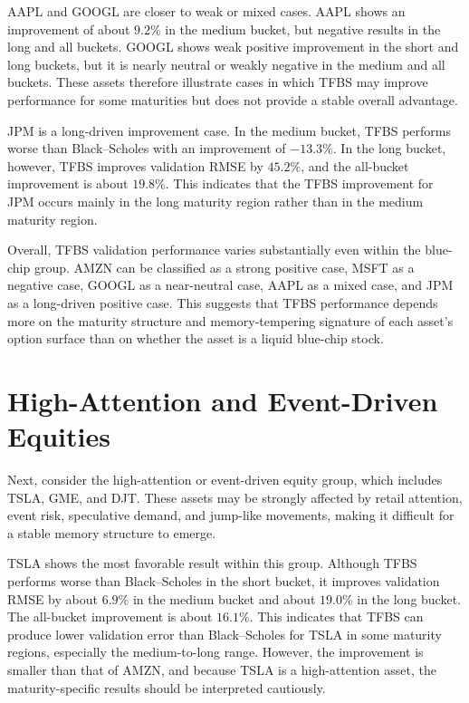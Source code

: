 \documentclass[11pt,a4paper]{report}
\begin{document}
AAPL and GOOGL are closer to weak or mixed cases. AAPL shows an improvement of about $9.2\%$ in the medium bucket, but negative results in the long and all buckets. GOOGL shows weak positive improvement in the short and long buckets, but it is nearly neutral or weakly negative in the medium and all buckets. These assets therefore illustrate cases in which TFBS may improve performance for some maturities but does not provide a stable overall advantage.

JPM is a long-driven improvement case. In the medium bucket, TFBS performs worse than Black--Scholes with an improvement of $-13.3\%$. In the long bucket, however, TFBS improves validation RMSE by $45.2\%$, and the all-bucket improvement is about $19.8\%$. This indicates that the TFBS improvement for JPM occurs mainly in the long maturity region rather than in the medium maturity region.

Overall, TFBS validation performance varies substantially even within the blue-chip group. AMZN can be classified as a strong positive case, MSFT as a negative case, GOOGL as a near-neutral case, AAPL as a mixed case, and JPM as a long-driven positive case. This suggests that TFBS performance depends more on the maturity structure and memory-tempering signature of each asset's option surface than on whether the asset is a liquid blue-chip stock.

\section{High-Attention and Event-Driven Equities}

Next, consider the high-attention or event-driven equity group, which includes TSLA, GME, and DJT. These assets may be strongly affected by retail attention, event risk, speculative demand, and jump-like movements, making it difficult for a stable memory structure to emerge.

TSLA shows the most favorable result within this group. Although TFBS performs worse than Black--Scholes in the short bucket, it improves validation RMSE by about $6.9\%$ in the medium bucket and about $19.0\%$ in the long bucket. The all-bucket improvement is about $16.1\%$. This indicates that TFBS can produce lower validation error than Black--Scholes for TSLA in some maturity regions, especially the medium-to-long range. However, the improvement is smaller than that of AMZN, and because TSLA is a high-attention asset, the maturity-specific results should be interpreted cautiously.
\end{document}
